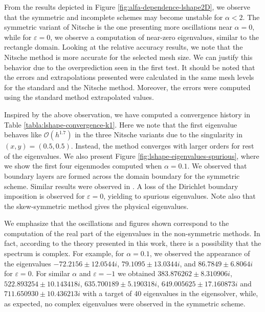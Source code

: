 \documentclass[onefignum,onetabnum,final]{siamart250211}
\numberwithin{equation}{section}
\newcommand\0{\boldsymbol{0}}
\begin{document}
	From the results depicted in Figure \ref{fig:alfa-dependence-lshape2D}, we observe that the symmetric and incomplete schemes may become unstable for $\alpha<2$. The symmetric variant of Nitsche is the one presenting more oscillations near $\alpha=0$, while for $\varepsilon=0$, we observe a computation of near-zero eigenvalues, similar to the rectangle domain. Looking at the relative accuracy results, we note that the Nitsche method is more accurate for the selected mesh size. We can justify this behavior due to the overprediction seen in the first test. It should be noted that the errors and extrapolations presented were calculated in the same mesh levels for the standard and the Nitsche method. Moreover, the errors were computed using the standard method extrapolated values.
	
	Inspired by the above observation, we have computed a convergence history in Table \ref{tabla:lshape-convergence-k1}. Here we note that the first eigenvalue behaves like $\mathcal{O}(h^{1.7})$ in the three Nitsche variants due to the singularity in $(x,y)=(0.5,0.5)$. Instead, the method converges with larger orders for rest of the eigenvalues. We also present Figure \ref{fig:lshape-eigenvalues-spurious}, where we show the first four eigenmodes computed when $\alpha=0.1$. We observed that boundary layers are formed across the domain boundary for the symmetric scheme. Similar results were observed in \cite{harari2018spectral}. A loss of the Dirichlet boundary imposition is observed for $\varepsilon=0$, yielding to spurious eigenvalues. Note also that the skew-symmetric method gives the physical eigenvalues.
	
	
	We emphasize that the oscillations and figures shown correspond to the computation of the real part of the eigenvalues in the non-symmetric methods. In fact, according to the theory presented in this work, there is a possibility that the spectrum is complex. For example, for $\alpha=0.1$, we observed the appearance of the eigenvalues $-72.2156 \pm 12.0544i$, $79.1095\pm 13.0344i$, and $86.7849\pm 6.8064i$ for $\varepsilon=0$. For similar $\alpha$ and $\varepsilon=-1$ we obtained $383.876262\pm8.310906i$, $522.893254\pm10.143418i$, $635.700189\pm5.190318i$, $649.005625\pm17.160873i$ and $711.650930\pm10.436213i$ with a target of 40 eigenvalues in the eigensolver, while, as expected, no complex eigenvalues were observed in the symmetric scheme.
	
\end{document}
